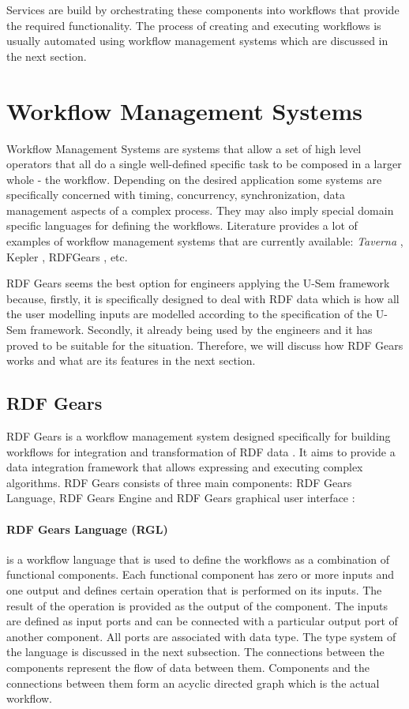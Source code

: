 Services are build by orchestrating these components into workflows that provide the required functionality. The process of creating and executing workflows is usually automated using workflow management systems which are discussed in the next section.

\section{Workflow Management Systems}
Workflow Management Systems are systems that allow a set of high level operators that all do a single well-defined specific task to be composed in a larger whole - the workflow. Depending on the desired application some systems are specifically concerned with  timing, concurrency, synchronization, data management aspects of a complex process. They may also imply special domain specific languages for defining the workflows. Literature provides a lot of examples of workflow management systems that are currently available: \textit{Taverna} \cite{hull2006taverna}, Kepler \cite{ludascher2006scientific}, RDFGears \cite{feliksik2011}, etc.

RDF Gears seems the best option for engineers applying the U-Sem framework because, firstly, it is specifically designed to deal with RDF data which is how all the user modelling inputs are modelled according to the specification of the U-Sem framework. Secondly, it already being used by the engineers and it has proved to be suitable for the situation. Therefore, we will discuss how RDF Gears works and what are its features in the next section.

\subsection{RDF Gears}

RDF Gears is a workflow management system designed specifically for building workflows for integration and transformation of RDF data \cite{feliksik2011}. It aims to provide a data integration framework that allows expressing and executing complex algorithms. RDF Gears consists of three main components: RDF Gears Language, RDF Gears Engine and RDF Gears graphical user interface \cite{feliksik2011}:

\paragraph{RDF Gears Language (RGL)} is a workflow language that is used to define the workflows as a combination of functional components. Each functional component has zero or more inputs and one output and defines certain operation that is performed on its inputs. The result of the operation is provided as the output of the component. The inputs are defined as input ports and can be connected with a particular output port of another component. All ports are associated with data type. The type system of the language is discussed in the next subsection. The connections between the components represent the flow of data between them. Components and the connections between them form an acyclic directed graph which is the actual workflow. 

